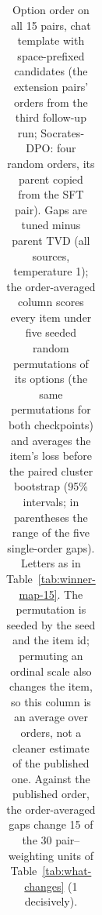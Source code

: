 \begin{table}[t]
\begin{tabular}{@{}llcccc@{}}
\bottomrule
\end{tabular}
\caption{Option order on all 15 pairs, chat template with space-prefixed candidates (the extension pairs' orders from the third follow-up run; Socrates-DPO: four random orders, its parent copied from the SFT pair). Gaps are tuned minus parent TVD (all sources, temperature 1); the order-averaged column scores every item under five seeded random permutations of its options (the same permutations for both checkpoints) and averages the item's loss before the paired cluster bootstrap (95\% intervals; in parentheses the range of the five single-order gaps). Letters as in Table~\ref{tab:winner-map-15}. The permutation is seeded by the seed and the item id; permuting an ordinal scale also changes the item, so this column is an average over orders, not a cleaner estimate of the published one. Against the published order, the order-averaged gaps change 15 of the 30 pair--weighting units of Table~\ref{tab:what-changes} (1 decisively).}
\label{tab:order-marginal}
\end{table}
